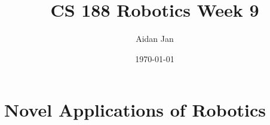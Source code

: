 \documentclass[10pt]{article}
\title{CS 188 Robotics Week 9}
\author{Aidan Jan}
\date{\today}
\begin{document}
\maketitle 

\section*{Novel Applications of Robotics}
\end{document}
